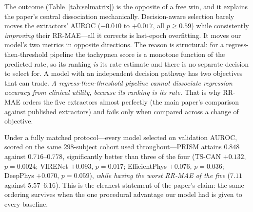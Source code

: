 The outcome (Table~\ref{tab:selmatrix}) is the opposite of a free win, and it explains the paper's
central dissociation mechanically. Decision-aware selection barely moves the extractors' AUROC
(${-}0.010$ to ${+}0.017$, all $p\ge0.59$) while consistently \emph{improving} their RR-MAE---all it
corrects is last-epoch overfitting. It moves our model's two metrics in opposite directions. The reason
is structural: for a regress-then-threshold pipeline the tachypnea score is a monotone function of the
predicted rate, so its ranking \emph{is} its rate estimate and there is no separate decision to select
for. A model with an independent decision pathway has two objectives that can trade.
\emph{A regress-then-threshold pipeline cannot dissociate regression accuracy from clinical utility,
because its ranking is its rate.} That is why RR-MAE orders the five extractors almost perfectly
(the main paper's comparison against published extractors) and fails only when compared across
a change of objective.

Under a fully matched protocol---every model selected on validation AUROC, scored on the same
$298$-subject cohort used throughout---PRISM attains $0.848$ against $0.716$--$0.778$, significantly
better than three of the four (TS-CAN $+0.132$, $p=0.0024$; VIRENet $+0.093$, $p=0.017$;
EfficientPhys $+0.076$, $p=0.036$; DeepPhys $+0.070$, $p=0.059$), \emph{while having the worst RR-MAE
of the five} ($7.11$ against $5.57$--$6.16$). This is the cleanest statement of the paper's claim: the
same ordering survives when the one procedural advantage our model had is given to every baseline.

